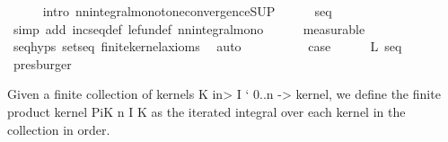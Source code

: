 \begin{isabellebody}
\ \ \ \ \isamarkupfalse%
\ {\isacharparenleft}{\kern0pt}intro\ nn{\isacharunderscore}{\kern0pt}integral{\isacharunderscore}{\kern0pt}monotone{\isacharunderscore}{\kern0pt}convergence{\isacharunderscore}{\kern0pt}SUP{\isacharparenright}{\kern0pt}\isanewline
\ \ \ \ \isamarkupfalse%
\ seq{\isacharparenleft}{\kern0pt}{}{\isacharparenright}{\kern0pt}\ \isamarkupfalse%
\ {\isacharparenleft}{\kern0pt}simp\ add{\isacharcolon}{\kern0pt}\ incseq{\isacharunderscore}{\kern0pt}def\ le{\isacharunderscore}{\kern0pt}fun{\isacharunderscore}{\kern0pt}def\ nn{\isacharunderscore}{\kern0pt}integral{\isacharunderscore}{\kern0pt}mono{\isacharparenright}{\kern0pt}\isanewline
\ \ \ \ \isamarkupfalse%
\ measurable\isanewline
\ \ \ \ \isamarkupfalse%
\ seq{\isachardot}{\kern0pt}hyps{\isacharparenleft}{\kern0pt}{}{\isacharparenright}{\kern0pt}\ sets{\isacharunderscore}{\kern0pt}eq\ finite{\isacharunderscore}{\kern0pt}kernel{\isacharunderscore}{\kern0pt}axioms\ \isamarkupfalse%
\ auto\isanewline
\ \ \ \ \isamarkupfalse%
\isanewline
\ \ \isamarkupfalse%
\ \isamarkupfalse%
\ {\isacharquery}{\kern0pt}case\isanewline
\ \ \ \ \isamarkupfalse%
\ L\ seq{\isacharparenleft}{\kern0pt}{}{\isacharparenright}{\kern0pt}\ \isamarkupfalse%
\ presburger\isanewline
{}\isamarkupfalse%
%
\endisatagproof
{\isafoldproof}%
%
\isadelimproof
%
\endisadelimproof
\isanewline
\isanewline
{}\isamarkupfalse%
%
\isadelimdocument
%
\endisadelimdocument
%
\isatagdocument
%
\isamarkuptrue%
%
\endisatagdocument
{\isafolddocument}%
%
\isadelimdocument
%
\endisadelimdocument
%
\begin{isamarkuptext}%
Given a finite collection of kernels K \<in> I ` {0..n} -> kernel, we define the finite product
  kernel PiK n I K as the iterated integral over each kernel in the collection in order.%
\end{isamarkuptext}\isamarkuptrue%
%
\end{isabellebody}
